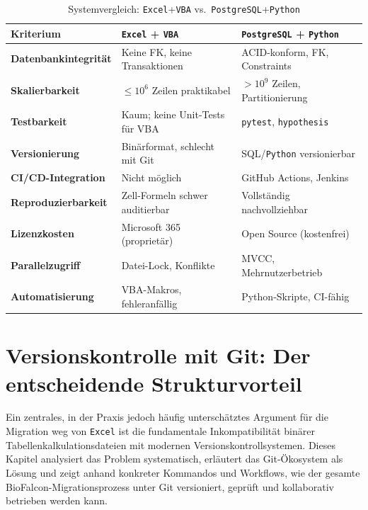 \documentclass[12pt,a4paper]{report}
\theoremstyle{definition}
\theoremstyle{remark}
\newcommand{\excel}{\texttt{Excel}}
\newcommand{\vba}{\texttt{VBA}}
\newcommand{\pg}{\texttt{PostgreSQL}}
\newcommand{\py}{\texttt{Python}}
\newcommand{\code}[1]{\texttt{#1}}
\begin{document}
\begin{table}[H]
\centering
\caption{Systemvergleich: \excel{}+\vba{} vs.\ \pg{}+\py}
\label{tab:vergleich}
\renewcommand{\arraystretch}{1.35}
\begin{tabularx}{\linewidth}{>{\bfseries\footnotesize}l
                              >{\footnotesize}X
                              >{\footnotesize}X}
\toprule
Kriterium          & \excel{} + \vba{}                       & \pg{} + \py{} \\
\midrule
Datenbankintegrität & Keine FK, keine Transaktionen          & ACID-konform, FK, Constraints \\
Skalierbarkeit      & $\leq 10^6$ Zeilen praktikabel         & $> 10^9$ Zeilen, Partitionierung \\
Testbarkeit         & Kaum; keine Unit-Tests für VBA         & \code{pytest}, \code{hypothesis} \\
Versionierung       & Binärformat, schlecht mit Git           & SQL/\py{} versionierbar \\
CI/CD-Integration   & Nicht m\"oglich                           & GitHub Actions, Jenkins \\
Reproduzierbarkeit  & Zell-Formeln schwer auditierbar         & Vollständig nachvollziehbar \\
Lizenzkosten        & Microsoft 365 (proprietär)             & Open Source (kostenfrei) \\
Parallelzugriff     & Datei-Lock, Konflikte                  & MVCC, Mehrnutzerbetrieb \\
Automatisierung     & VBA-Makros, fehleranfällig             & Python-Skripte, CI-fähig \\
\bottomrule
\end{tabularx}
\end{table}

\newpage
\chapter{Versionskontrolle mit Git: Der entscheidende Strukturvorteil}
\label{sec:git}

Ein zentrales, in der Praxis jedoch häufig unterschätztes Argument für die
Migration weg von \excel{} ist die fundamentale Inkompatibilität binärer
Tabellenkalkulationsdateien mit modernen Versionskontrollsystemen.
Dieses Kapitel analysiert das Problem systematisch, erläutert das
Git-Ökosystem als Lösung und zeigt anhand konkreter Kommandos und
Workflows, wie der gesamte BioFalcon-Migrationsprozess unter Git
versioniert, geprüft und kollaborativ betrieben werden kann.
\end{document}
